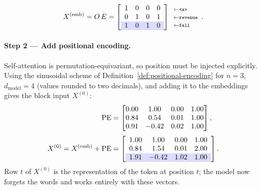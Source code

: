 \begin{deepdive}
\begin{equation*}
  X^{(\mathrm{emb})} = O\,E =
  \left[\begin{array}{cccc}
    1 & 0 & 0 & 0\\
    0 & 1 & 0 & 1\\
    \rowcolor{blue!14} 1 & 0 & 1 & 0
  \end{array}\right]
  \begin{array}{l}
    \scriptstyle\leftarrow\texttt{<s>}\\[-1pt]\scriptstyle\leftarrow\texttt{revenue}\\[-1pt]
    \scriptstyle\leftarrow\texttt{fell}
  \end{array}.
\end{equation*}

\paragraph{Step 2 --- Add positional encoding.}
Self-attention is permutation-equivariant, so position must be injected explicitly.
Using the sinusoidal scheme of Definition~\ref{def:positional-encoding} for
$n = 3$, $d_{\mathrm{model}} = 4$ (values rounded to two decimals), and adding it to
the embeddings gives the block input $X^{(0)}$:
\begin{align*}
  \mathrm{PE} &=
  \begin{bmatrix}
    0.00 & 1.00 & 0.00 & 1.00\\
    0.84 & 0.54 & 0.01 & 1.00\\
    0.91 & -0.42 & 0.02 & 1.00
  \end{bmatrix},\\[3pt]
  X^{(0)} = X^{(\mathrm{emb})} + \mathrm{PE} &=
  \left[\begin{array}{cccc}
    1.00 & 1.00 & 0.00 & 1.00\\
    0.84 & 1.54 & 0.01 & 2.00\\
    \rowcolor{blue!14} 1.91 & -0.42 & 1.02 & 1.00
  \end{array}\right].
\end{align*}
Row $t$ of $X^{(0)}$ is the representation of the token at position $t$; the model now
forgets the words and works entirely with these vectors.


\end{deepdive}
